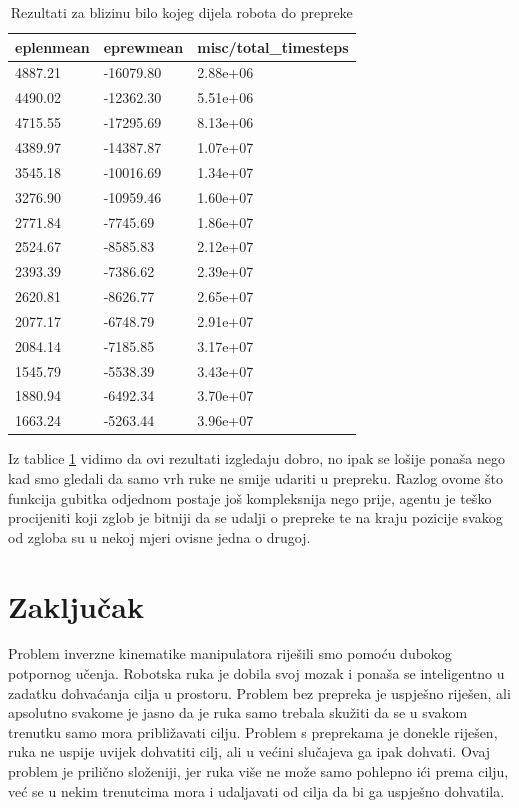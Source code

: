 \documentclass[times,utf8,diplomski]{fer}
\begin{document}
\begin{table}[ht!]
\centering
\caption{Rezultati za blizinu bilo kojeg dijela robota do prepreke}
\label{tab:svi}
\begin{tabular}{@{}lll@{}}
\hline
eplenmean & eprewmean & misc/total\_timesteps \\
\hline
\hline
4887.21 & -16079.80 & 2.88e+06 \\ 
4490.02 & -12362.30 & 5.51e+06 \\ 
4715.55 & -17295.69 & 8.13e+06 \\ 
4389.97 & -14387.87 & 1.07e+07 \\ 
3545.18 & -10016.69 & 1.34e+07 \\ 
3276.90 & -10959.46 & 1.60e+07 \\ 
2771.84 & -7745.69 & 1.86e+07 \\ 
2524.67 & -8585.83 & 2.12e+07 \\ 
2393.39 & -7386.62 & 2.39e+07 \\ 
2620.81 & -8626.77 & 2.65e+07 \\ 
2077.17 & -6748.79 & 2.91e+07 \\ 
2084.14 & -7185.85 & 3.17e+07 \\ 
1545.79 & -5538.39 & 3.43e+07 \\ 
1880.94 & -6492.34 & 3.70e+07 \\ 
1663.24 & -5263.44 & 3.96e+07 \\ 
\hline
\end{tabular}
\end{table} 

Iz tablice \ref{tab:svi} vidimo da ovi rezultati izgledaju dobro, no ipak se lošije ponaša nego kad smo gledali da samo vrh ruke ne smije udariti u prepreku. Razlog ovome što funkcija gubitka odjednom postaje još kompleksnija nego prije, agentu je teško procijeniti koji zglob je bitniji da se udalji o prepreke te na kraju pozicije svakog od zgloba su u nekoj mjeri ovisne jedna o drugoj.

\clearpage
\chapter{Zaključak}

Problem inverzne kinematike manipulatora riješili smo pomoću dubokog potpornog učenja. Robotska ruka je dobila svoj mozak i ponaša se inteligentno u zadatku dohvaćanja cilja u prostoru. Problem bez prepreka je uspješno riješen, ali apsolutno svakome je jasno da je ruka samo trebala skužiti da se u svakom trenutku samo mora približavati cilju. Problem s preprekama je donekle riješen, ruka ne uspije uvijek dohvatiti cilj, ali u većini slučajeva ga ipak dohvati. Ovaj problem je prilično složeniji, jer ruka više ne može samo pohlepno ići prema cilju, već se u nekim trenutcima mora i udaljavati od cilja da bi ga uspješno dohvatila.
\end{document}
